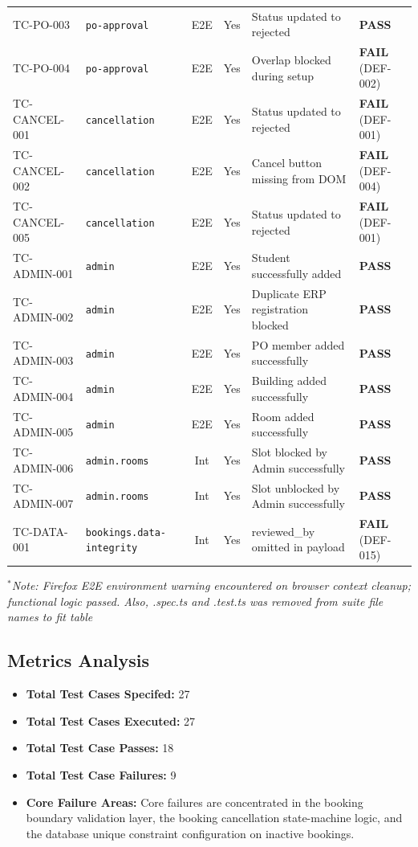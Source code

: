 \documentclass[11pt,a4paper]{article}
\begin{document}
\begin{center}
\begin{longtable}{@{}lp{3.6cm}ccp{4.5cm}p{2cm}@{}}
TC-PO-003 & \texttt{po-approval} & E2E & Yes & Status updated to rejected & \textbf{PASS} \\
TC-PO-004 & \texttt{po-approval} & E2E & Yes & Overlap blocked during setup & \textbf{FAIL} (DEF-002) \\ \midrule
TC-CANCEL-001 & \texttt{cancellation} & E2E & Yes & Status updated to rejected & \textbf{FAIL} (DEF-001) \\
TC-CANCEL-002 & \texttt{cancellation} & E2E & Yes & Cancel button missing from DOM & \textbf{FAIL} (DEF-004) \\
TC-CANCEL-005 & \texttt{cancellation} & E2E & Yes & Status updated to rejected & \textbf{FAIL} (DEF-001) \\ \midrule
TC-ADMIN-001 & \texttt{admin} & E2E & Yes & Student successfully added & \textbf{PASS} \\
TC-ADMIN-002 & \texttt{admin} & E2E & Yes & Duplicate ERP registration blocked & \textbf{PASS} \\
TC-ADMIN-003 & \texttt{admin} & E2E & Yes & PO member added successfully & \textbf{PASS} \\
TC-ADMIN-004 & \texttt{admin} & E2E & Yes & Building added successfully & \textbf{PASS} \\
TC-ADMIN-005 & \texttt{admin} & E2E & Yes & Room added successfully & \textbf{PASS} \\
TC-ADMIN-006 & \texttt{admin.rooms} & Int & Yes & Slot blocked by Admin successfully & \textbf{PASS} \\
TC-ADMIN-007 & \texttt{admin.rooms} & Int & Yes & Slot unblocked by Admin successfully & \textbf{PASS} \\ \midrule
TC-DATA-001 & \texttt{bookings.data-integrity} & Int & Yes & reviewed\_by omitted in payload & \textbf{FAIL} (DEF-015) \\
\end{longtable}
\end{center}
\noindent\textit{$^{*}$Note: Firefox E2E environment warning encountered on browser context cleanup; functional logic passed. Also, .spec.ts and .test.ts was removed from suite file names to fit table}

\subsection{Metrics Analysis}
\begin{itemize}
    \item \textbf{Total Test Cases Specifed:} 27
    \item \textbf{Total Test Cases Executed:} 27
    \item \textbf{Total Test Case Passes:} 18
    \item \textbf{Total Test Case Failures:} 9
    \item \textbf{Core Failure Areas:} Core failures are concentrated in the booking boundary validation layer, the booking cancellation state-machine logic, and the database unique constraint configuration on inactive bookings.
\end{itemize}
\end{document}
